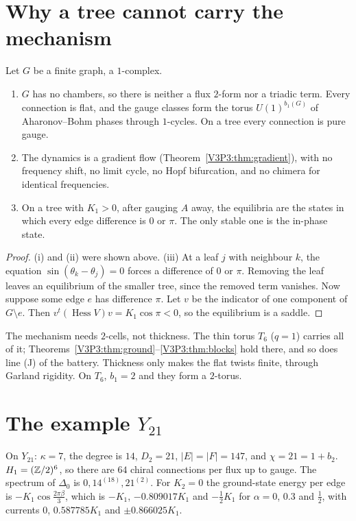 \section{Why a tree cannot carry the mechanism}\label{V3P3:sec:tree}

\begin{proposition}\label{V3P3:prop:tree}
Let $G$ be a finite graph, a $1$-complex.
\begin{enumerate}
\item[(i)] $G$ has no chambers, so there is neither a flux $2$-form nor a triadic term. Every
connection is flat, and the gauge classes form the torus $U(1)^{b_1(G)}$ of Aharonov--Bohm
phases through $1$-cycles. On a tree every connection is pure gauge.
\item[(ii)] The dynamics is a gradient flow (Theorem~\ref{V3P3:thm:gradient}), with no
frequency shift, no limit cycle, no Hopf bifurcation, and no chimera for identical
frequencies.
\item[(iii)] On a tree with $K_1>0$, after gauging $A$ away, the equilibria are the states in
which every edge difference is $0$ or $\pi$. The only stable one is the in-phase state.
\end{enumerate}
\end{proposition}

\begin{proof}
(i) and (ii) were shown above. (iii) At a leaf $j$ with neighbour $k$, the equation
$\sin(\theta_k-\theta_j)=0$ forces a difference of $0$ or $\pi$. Removing the leaf leaves an
equilibrium of the smaller tree, since the removed term vanishes. Now suppose some edge $e$
has difference $\pi$. Let $v$ be the indicator of one component of $G\setminus e$. Then
$v^{t}(\operatorname{Hess}V)v=K_1\cos\pi<0$, so the equilibrium is a saddle.
\end{proof}

The mechanism needs $2$-cells, not thickness. The thin torus $T_6$ ($q=1$) carries all of it;
Theorems~\ref{V3P3:thm:ground}--\ref{V3P3:thm:blocks} hold there, and so does line (J) of the
battery. Thickness only makes the flat twists finite, through Garland rigidity. On $T_6$,
$b_1=2$ and they form a $2$-torus.

\section{The example \texorpdfstring{$Y_{21}$}{Y21}}\label{V3P3:sec:example}

On $Y_{21}$: $\kappa=7$, the degree is $14$, $D_2=21$, $|E|=|F|=147$, and
$\chi=21=1+b_2$. $H_1=(\mathbb{Z}/2)^{6}$, so there are $64$ chiral connections per flux up to gauge.
The spectrum of $\Delta_0$ is $0,14^{(18)},21^{(2)}$. For $K_2=0$ the ground-state energy per
edge is $-K_1\cos\frac{2\pi\beta}3$, which is $-K_1$, $-0.809017K_1$ and $-\frac12K_1$ for
$\alpha=0$, $0.3$ and $\frac12$, with currents $0$, $0.587785K_1$ and $\pm0.866025K_1$.

